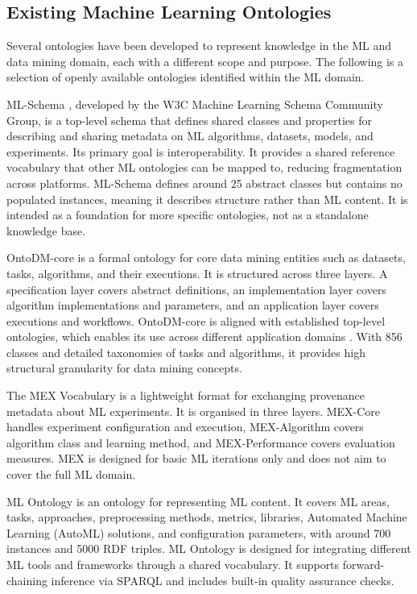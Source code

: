 \subsection{Existing Machine Learning Ontologies}
\label{sec:existing-machine-learning-ontologies}

Several ontologies have been developed to represent knowledge
in the ML and data mining domain, each with a different scope
and purpose. The following is a selection of openly available
ontologies identified within the ML domain.

ML-Schema \parencite{publio2018ml_schema_exposing_semantics_machine_learning_schemas_ontologies},
developed by the W3C Machine Learning Schema Community Group, is a
top-level schema that defines shared classes and properties for
describing and sharing metadata on ML algorithms, datasets, models,
and experiments.
Its primary goal is interoperability. It provides a shared
reference vocabulary that other ML ontologies can be mapped to,
reducing fragmentation across platforms.
ML-Schema defines around 25 abstract classes but contains no
populated instances, meaning it describes structure rather than
ML content.
It is intended as a foundation for more specific ontologies,
not as a standalone knowledge base.

OntoDM-core \parencite{panov2014ontology_core_data_mining_entities}
is a formal ontology for core data mining entities such as
datasets, tasks, algorithms, and their executions.
It is structured across three layers. A specification layer
covers abstract definitions, an implementation layer covers
algorithm implementations and parameters, and an application
layer covers executions and workflows.
OntoDM-core is aligned with established top-level ontologies,
which enables its use across different application domains
\parencite{panov2014ontology_core_data_mining_entities}.
With 856 classes and detailed taxonomies of tasks and
algorithms, it provides high structural granularity 
for data mining concepts.

The MEX Vocabulary \parencite{esteves2015mexvoc} is a
lightweight format for exchanging provenance metadata about
ML experiments.
It is organised in three layers. MEX-Core handles experiment
configuration and execution, MEX-Algorithm covers algorithm
class and learning method, and MEX-Performance covers
evaluation measures.
MEX is designed for basic ML iterations only and does not aim
to cover the full ML domain.

ML Ontology \parencite{humm2026industry_ready_machine_learning_ontology}
is an ontology for representing ML content. It covers ML areas,
tasks, approaches, preprocessing methods, metrics, libraries,
Automated Machine Learning (AutoML) solutions, and configuration parameters, with around 700
instances and 5000 RDF triples. ML Ontology
is designed for integrating
different ML tools and frameworks through a shared vocabulary. It
supports forward-chaining inference via SPARQL and
includes built-in quality assurance checks.

